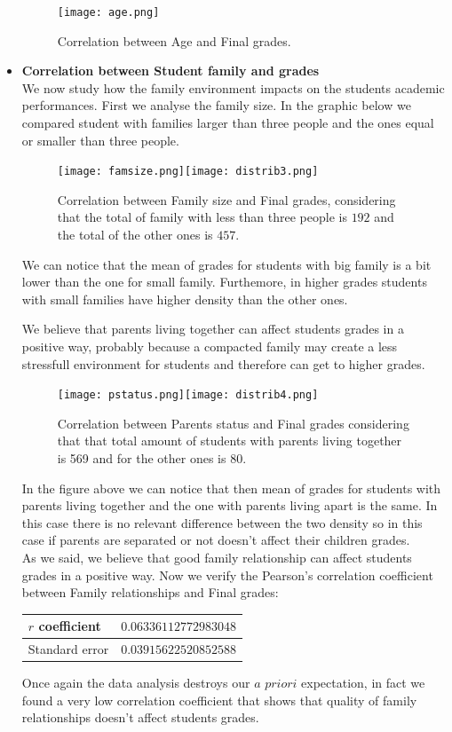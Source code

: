 \documentclass[a4paper, 11pt]{report}
\theoremstyle{definition}
\numberwithin{equation}{section}		%
\numberwithin{figure}{section}			%
\numberwithin{table}{section}				%
\begin{document}
\begin{itemize}
\begin{figure}[h]\centering
\texttt{[image: age.png]}
\caption{Correlation between Age and Final grades.}
\end{figure}


\item \textbf{Correlation between Student family and grades}
\\We now study how the family environment impacts on the students academic performances. First we analyse the family size. In the graphic below we compared student with families larger than three people and the ones equal or smaller than three people.

\begin{figure}[h]\centering
\texttt{[image: famsize.png]}\quad\texttt{[image: distrib3.png]}
\caption{Correlation between Family size and Final grades, considering that the total of family with less than three people is $192$ and the total of the other ones is $457$.}
\end{figure}
We can notice that the mean of grades for students with big family is a bit lower than the one for small family. Furthemore, in higher grades students with small families have higher density than the other ones.

We believe that parents living together can affect students grades in a positive way, probably because a compacted family may create a less stressfull environment for students and therefore can get to higher grades.
\begin{figure}[h]\centering
\texttt{[image: pstatus.png]}\quad\texttt{[image: distrib4.png]}
\caption{Correlation between Parents status and Final grades considering that that total amount of students with parents living together is 569 and for the other ones is 80.}
\end{figure}

In the figure above we can notice that then mean of grades for students with parents living together and the one with parents living apart is the same. In this case there is no relevant difference between the two density so in this case if parents are separated or not doesn't affect their children grades.
\\As we said, we believe that good family relationship can affect students grades in a positive way.
Now we verify the Pearson's correlation coefficient between Family relationships and Final grades:
\begin{center}
\begin{tabular}{|p{3cm}|p{4cm}|}
$r$ coefficient & $0.06336112772983048$ \\
\hline
Standard error & $0.03915622520852588$ \\
\hline
\end{tabular}
\end{center}
Once again the data analysis destroys our $a$ $priori$ expectation, in fact we found a very low correlation coefficient that shows that quality of family relationships doesn't affect students grades.


\end{itemize}
\end{document}
